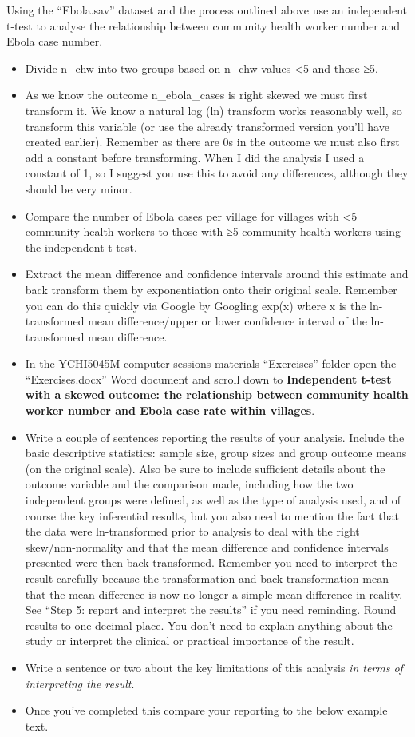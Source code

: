 \documentclass[
]{book}
\begin{document}
Using the ``Ebola.sav'' dataset and the process outlined above use an independent t-test to analyse the relationship between community health worker number and Ebola case number.

\begin{itemize}
\item
  Divide n\_chw into two groups based on n\_chw values \textless5 and those ≥5.
\item
  As we know the outcome n\_ebola\_cases is right skewed we must first transform it. We know a natural log (ln) transform works reasonably well, so transform this variable (or use the already transformed version you'll have created earlier). Remember as there are 0s in the outcome we must also first add a constant before transforming. When I did the analysis I used a constant of 1, so I suggest you use this to avoid any differences, although they should be very minor.
\item
  Compare the number of Ebola cases per village for villages with \textless5 community health workers to those with ≥5 community health workers using the independent t-test.
\item
  Extract the mean difference and confidence intervals around this estimate and back transform them by exponentiation onto their original scale. Remember you can do this quickly via Google by Googling exp(x) where x is the ln-transformed mean difference/upper or lower confidence interval of the ln-transformed mean difference.
\item
  In the YCHI5045M computer sessions materials ``Exercises'' folder open the ``Exercises.docx'' Word document and scroll down to \textbf{Independent t-test with a skewed outcome: the relationship between community health worker number and Ebola case rate within villages}.
\item
  Write a couple of sentences reporting the results of your analysis. Include the basic descriptive statistics: sample size, group sizes and group outcome means (on the original scale). Also be sure to include sufficient details about the outcome variable and the comparison made, including how the two independent groups were defined, as well as the type of analysis used, and of course the key inferential results, but you also need to mention the fact that the data were ln-transformed prior to analysis to deal with the right skew/non-normality and that the mean difference and confidence intervals presented were then back-transformed. Remember you need to interpret the result carefully because the transformation and back-transformation mean that the mean difference is now no longer a simple mean difference in reality. See ``Step 5: report and interpret the results'' if you need reminding. Round results to one decimal place. You don't need to explain anything about the study or interpret the clinical or practical importance of the result.
\item
  Write a sentence or two about the key limitations of this analysis \emph{in terms of interpreting the result}.
\item
  Once you've completed this compare your reporting to the below example text.
\end{itemize}
\end{document}

